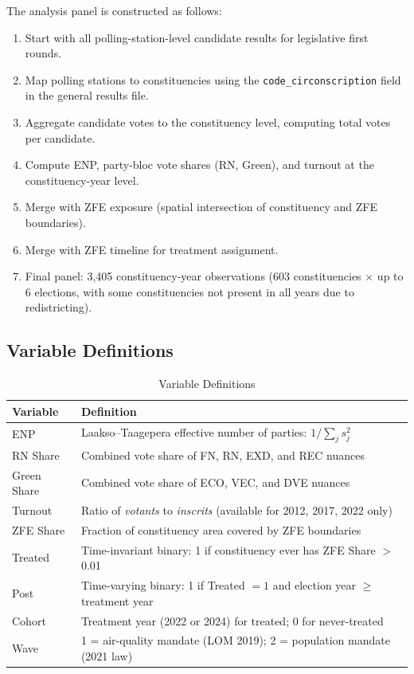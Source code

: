 \documentclass[12pt]{article}
\begin{document}
The analysis panel is constructed as follows:

\begin{enumerate}
\item Start with all polling-station-level candidate results for legislative first rounds.
\item Map polling stations to constituencies using the \texttt{code\_circonscription} field in the general results file.
\item Aggregate candidate votes to the constituency level, computing total votes per candidate.
\item Compute ENP, party-bloc vote shares (RN, Green), and turnout at the constituency-year level.
\item Merge with ZFE exposure (spatial intersection of constituency and ZFE boundaries).
\item Merge with ZFE timeline for treatment assignment.
\item Final panel: 3,405 constituency-year observations (603 constituencies $\times$ up to 6 elections, with some constituencies not present in all years due to redistricting).
\end{enumerate}

\subsection{Variable Definitions}

\begin{table}[H]
\centering
\caption{Variable Definitions}
\label{tab:variables}
\begin{tabular}{lp{10cm}}
\toprule
Variable & Definition \\
\midrule
ENP & Laakso--Taagepera effective number of parties: $1 / \sum_j s_j^2$ \\
RN Share & Combined vote share of FN, RN, EXD, and REC nuances \\
Green Share & Combined vote share of ECO, VEC, and DVE nuances \\
Turnout & Ratio of \textit{votants} to \textit{inscrits} (available for 2012, 2017, 2022 only) \\
ZFE Share & Fraction of constituency area covered by ZFE boundaries \\
Treated & Time-invariant binary: 1 if constituency ever has ZFE Share $>$ 0.01 \\
Post & Time-varying binary: 1 if Treated $= 1$ and election year $\geq$ treatment year \\
Cohort & Treatment year (2022 or 2024) for treated; 0 for never-treated \\
Wave & 1 = air-quality mandate (LOM 2019); 2 = population mandate (2021 law) \\
\bottomrule
\end{tabular}
\end{table}
\end{document}
